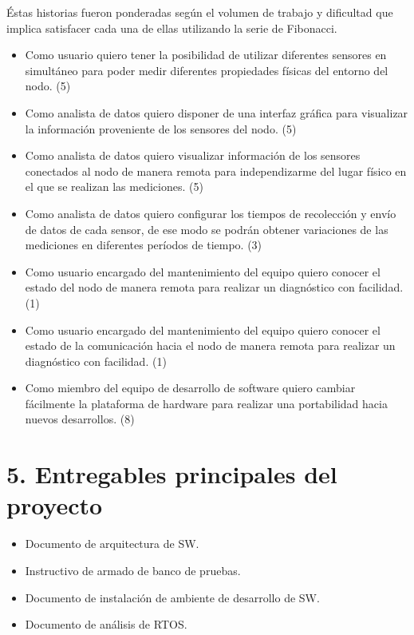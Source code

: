 \documentclass[11pt]{charter}
\begin{document}
Éstas historias fueron ponderadas según el volumen de trabajo y dificultad que implica satisfacer cada una de ellas utilizando la serie de Fibonacci.

\begin{itemize}
\item Como usuario quiero tener la posibilidad de utilizar diferentes sensores en simultáneo para poder medir diferentes propiedades físicas del entorno del nodo. (5)
\item Como analista de datos quiero disponer de una interfaz gráfica para visualizar la información proveniente de los sensores del nodo. (5)
\item Como analista de datos quiero visualizar información de los sensores conectados al nodo de manera remota para independizarme del lugar físico en el que se realizan las mediciones. (5)
\item Como analista de datos quiero configurar los tiempos de recolección y envío de datos de cada sensor, de ese modo se podrán obtener variaciones de las mediciones en diferentes períodos de tiempo. (3)
\item Como usuario encargado del mantenimiento del equipo quiero conocer el estado del nodo de manera remota para realizar un diagnóstico con facilidad. (1)
\item Como usuario encargado del mantenimiento del equipo quiero conocer el estado de la comunicación hacia el nodo de manera remota para realizar un diagnóstico con facilidad. (1)
\item Como miembro del equipo de desarrollo de software quiero cambiar fácilmente la plataforma de hardware para realizar una portabilidad hacia nuevos desarrollos. (8)
\end{itemize}

\section{5. Entregables principales del proyecto}
\label{sec:entregables}

\begin{itemize}
\item Documento de arquitectura de SW.
\item Instructivo de armado de banco de pruebas.
\item Documento de instalación de ambiente de desarrollo de SW.
\item Documento de análisis de RTOS.

\end{itemize}
\end{document}
